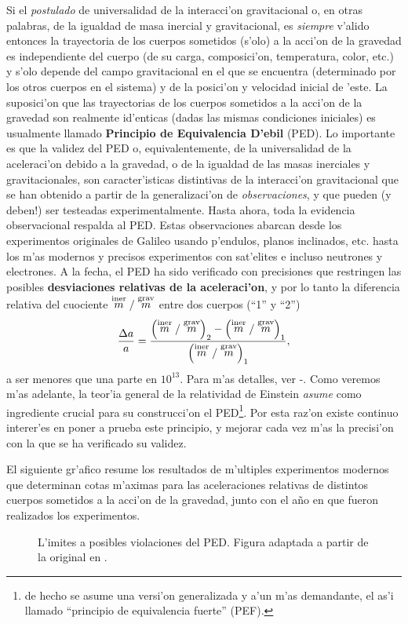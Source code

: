 Si el \textit{postulado} de universalidad de la interacci'on gravitacional o, en otras palabras, de la igualdad de masa inercial y gravitacional, es \textit{siempre} v'alido entonces la trayectoria de los cuerpos sometidos (s'olo) a la acci'on de la gravedad es independiente del cuerpo (de su carga, composici'on, temperatura, color, etc.) y s'olo depende del campo gravitacional en el que se encuentra (determinado por los otros cuerpos en el sistema) y de la posici'on y velocidad inicial de 'este. La suposici'on que las trayectorias de los cuerpos sometidos a la acci'on de la gravedad son realmente id'enticas (dadas las mismas condiciones iniciales) es usualmente llamado \textbf{Principio de Equivalencia D'ebil} (PED). Lo importante es que la validez del PED o, equivalentemente, de la universalidad de la aceleraci'on debido a la gravedad, o de la igualdad de las masas inerciales y gravitacionales, son caracter'isticas distintivas de la interacci'on gravitacional que se han obtenido a partir de la generalizaci'on de \textit{observaciones}, y que pueden (y deben!) ser testeadas experimentalmente. Hasta ahora, toda la evidencia observacional respalda al PED. Estas observaciones abarcan desde los experimentos originales de Galileo usando p'endulos, planos inclinados, etc. hasta los m'as modernos y precisos experimentos con sat'elites e incluso neutrones \cite{Koester76} y electrones. A la fecha, el PED ha sido verificado con precisiones que restringen las posibles \textbf{desviaciones relativas de la aceleraci'on}, y por lo tanto la diferencia relativa del cuociente $\stackrel{\rm iner}{m}/\stackrel{\rm grav}{m}$ entre dos cuerpos (``1'' y ``2'')
\begin{equation}
\frac{\Delta a}{a}=\frac{\left(\stackrel{\rm iner}{m}/\stackrel{\rm grav}{m}\right)_2-\left(\stackrel{\rm iner}{m}/\stackrel{\rm grav}{m}\right)_1}{\left(\stackrel{\rm iner}{m}/\stackrel{\rm grav}{m}\right)_1},
\end{equation}
a ser menores que una parte en $10^{13}$. Para m'as detalles, ver \cite{Will06}-\cite{STEP}. Como veremos m'as adelante, la teor'ia general de la relatividad de Einstein \textit{asume} como ingrediente crucial para su construcci'on el PED\footnote{de hecho se asume una versi'on generalizada y a'un m'as demandante, el as'i llamado ``principio de equivalencia fuerte'' (PEF).}. Por esta raz'on existe continuo interer'es en poner a prueba este principio, y mejorar cada vez m'as la precisi'on con la que se ha verificado su validez.

El siguiente gr'afico resume los resultados de m'ultiples experimentos modernos que determinan cotas m'aximas para las aceleraciones relativas de distintos cuerpos sometidos a la acci'on de la gravedad, junto con el a\~no en que fueron realizados los experimentos.
\begin{center}
\begin{figure}[H]
\centerline{}
\caption{L'imites a posibles violaciones del PED. Figura adaptada a partir de la original en \cite{Turyshev08}.}
\label{fig:equiv1}
\end{figure}
\end{center}

